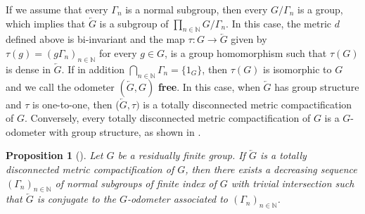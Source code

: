 \documentclass[titlepage,reqno,10pt]{amsart}
\newtheorem{proposition}[theorem]{Proposition}
\newtheorem{lemma}[theorem]{Lemma}
\newtheorem{corollary}[theorem]{Corollary}
\theoremstyle{definition}
\begin{document}
If we assume that every $\Gamma_n$ is a normal subgroup, then every $G/\Gamma_n$ is a group, which implies that $\overleftarrow{G}$ is a subgroup of $\prod_{n\in\mathbb{N}}G/\Gamma_n$. In this case, the metric $d$ defined above is bi-invariant and the map $\tau:G\to \overleftarrow{G}$ given by $\tau(g)=(g\Gamma_n)_{n\in\mathbb{N}}$ for every $g\in G$, is a group homomorphism such that $\tau(G)$ is dense in $\overleftarrow{G}$. If in addition $\bigcap_{n\in\mathbb{N}}\Gamma_n=\{1_G\}$, then $\tau(G)$ is isomorphic to $G$ and  we call the odometer $(\overleftarrow{G},G)$ {\bf free}.
In this case, when $\overleftarrow{G}$ has group structure and $\tau$ is one-to-one, then ($\overleftarrow{G},\tau)$ is a  totally disconnected metric compactification of $G$. Conversely, every totally disconnected metric compactification of $G$ is a $G$-odometer with group structure, as shown in \cite{CeCoGo23}.


\begin{proposition}[{\cite[Lemma 2.1]{CeCoGo23}}]\label{prop: totally disconnected compactification is odometer}
    Let $G$ be a residually finite group. 
    If $\overleftarrow{G}$ is a totally disconnected metric compactification of $G$, then there exists a decreasing sequence $(\Gamma_n)_{n\in\mathbb{N}}$ of normal subgroups of finite index of $G$ with trivial intersection such that $\overleftarrow{G}$ is conjugate to the $G$-odometer associated to $(\Gamma_n)_{n\in\mathbb{N}}$. 
\end{proposition}

\end{document}
